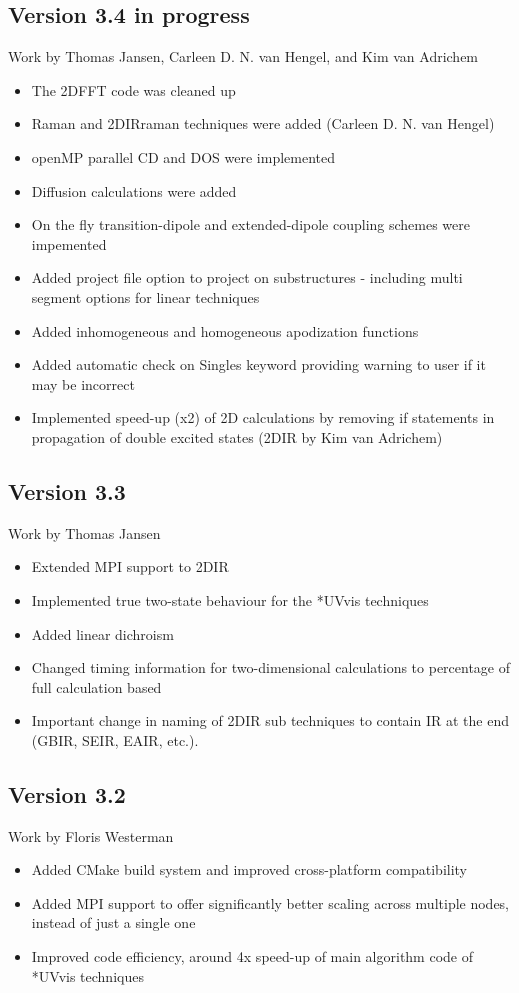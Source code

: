 \documentclass[12pt]{book}
\begin{document}
\subsection{Version 3.4 in progress}
{\small Work by Thomas Jansen, Carleen D. N. van Hengel, and Kim van Adrichem}
\begin{itemize}
\item The 2DFFT code was cleaned up
\item Raman and 2DIRraman techniques were added (Carleen D. N. van Hengel)
\item openMP parallel CD and DOS were implemented
\item Diffusion calculations were added
\item On the fly transition-dipole and extended-dipole coupling schemes were impemented
\item Added project file option to project on substructures - including multi segment options for linear techniques
\item Added inhomogeneous and homogeneous apodization functions
\item Added automatic check on Singles keyword providing warning to user if it may be incorrect
\item Implemented speed-up (x2) of 2D calculations by removing if statements in propagation of double excited states (2DIR by Kim van Adrichem)
\end{itemize}
\subsection{Version 3.3}
{\small Work by Thomas Jansen}
\begin{itemize}
\item Extended MPI support to 2DIR
\item Implemented true two-state behaviour for the *UVvis techniques
\item Added linear dichroism
\item Changed timing information for two-dimensional calculations to percentage of full calculation based
\item Important change in naming of 2DIR sub techniques to contain IR at the end (GBIR, SEIR, EAIR, etc.).
\end{itemize}
	\subsection{Version 3.2}
{\small Work by Floris Westerman}
\begin{itemize}
\item Added CMake build system and improved cross-platform compatibility
\item Added MPI support to offer significantly better scaling across multiple nodes, instead of just a single one
\item Improved code efficiency, around 4x speed-up of main algorithm code of *UVvis techniques
\end{itemize}
\end{document}
